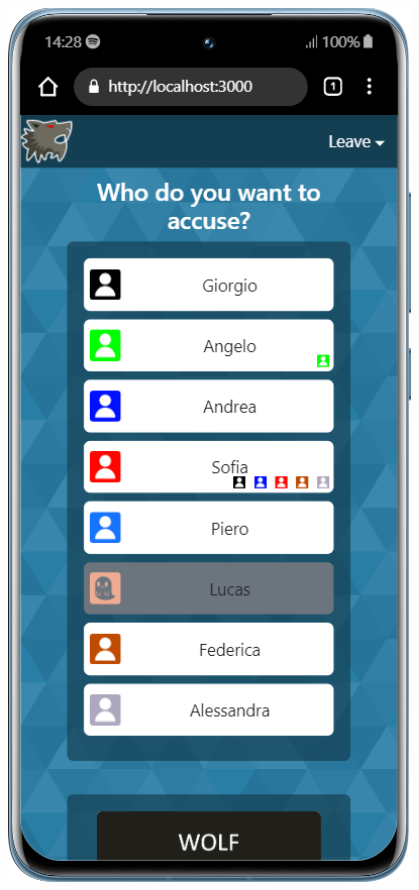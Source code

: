 \begin{figure}[H]
    \centering
    \begin{minipage}{0.25\textwidth}
        \centering
        \includegraphics[width=0.95\textwidth]{img/screen/mobile/accusation_mobile.png}

\end{minipage}
\end{figure}
